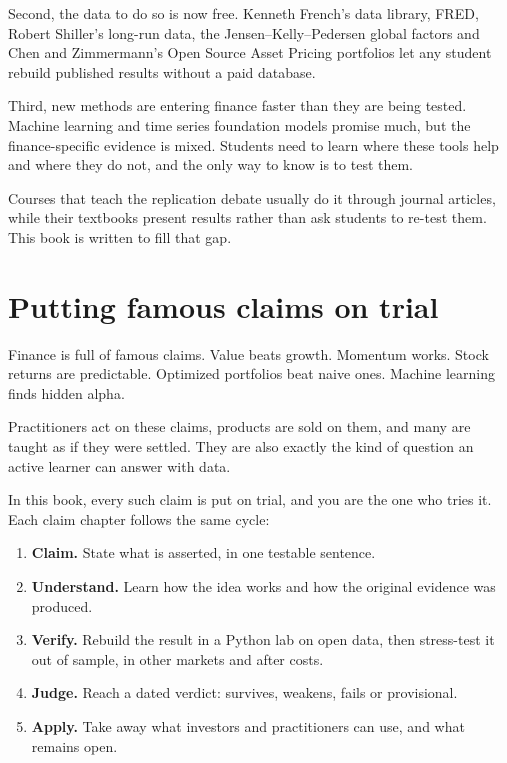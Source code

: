 Second, the data to do so is now free. Kenneth French's data library, FRED, Robert Shiller's long-run data, the Jensen--Kelly--Pedersen global factors and Chen and Zimmermann's Open Source Asset Pricing portfolios let any student rebuild published results without a paid database.

Third, new methods are entering finance faster than they are being tested. Machine learning and time series foundation models promise much, but the finance-specific evidence is mixed. Students need to learn where these tools help and where they do not, and the only way to know is to test them.

Courses that teach the replication debate usually do it through journal articles, while their textbooks present results rather than ask students to re-test them. This book is written to fill that gap.

\section*{Putting famous claims on trial}

Finance is full of famous claims. Value beats growth. Momentum works. Stock returns are predictable. Optimized portfolios beat naive ones. Machine learning finds hidden alpha.

Practitioners act on these claims, products are sold on them, and many are taught as if they were settled. They are also exactly the kind of question an active learner can answer with data.

In this book, every such claim is put on trial, and you are the one who tries it. Each claim chapter follows the same cycle:

\begin{enumerate}
  \item \textbf{Claim.} State what is asserted, in one testable sentence.
  \item \textbf{Understand.} Learn how the idea works and how the original evidence was produced.
  \item \textbf{Verify.} Rebuild the result in a Python lab on open data, then stress-test it out of sample, in other markets and after costs.
  \item \textbf{Judge.} Reach a dated verdict: survives, weakens, fails or provisional.
  \item \textbf{Apply.} Take away what investors and practitioners can use, and what remains open.
\end{enumerate}

